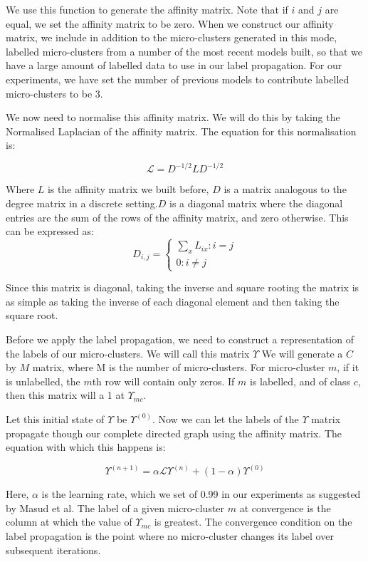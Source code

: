 \documentclass[12pt,a4paper,oneside]{report}
\begin{document}
We use this function to generate the affinity matrix. Note that if $i$ and $j$ are equal, we set the affinity matrix to be zero. When we construct our affinity matrix, we include in addition to the micro-clusters generated in this mode, labelled micro-clusters from a number of the most recent models built, so that we have a large amount of labelled data to use in our label propagation. For our experiments, we have set the number of previous models to contribute labelled micro-clusters to be 3.

We now need to normalise this affinity matrix. We will do this by taking the Normalised Laplacian of the affinity matrix. The equation for this normalisation is:

\[ \mathscr{L} = D^{-1/2}LD^{-1/2}\] 

Where $L$ is the affinity matrix we built before,  $D$ is a matrix analogous to the degree matrix in a discrete setting.$D$ is a diagonal matrix where the diagonal entries are the sum of the rows of the affinity matrix, and zero otherwise. This can be expressed as:
\[
	D_{i,j} =
	\begin{cases} 
	 \sum_{x} L_{ix} : i = j \\
	0 :					 i  \neq j 
\end{cases}\] 

Since this matrix is diagonal, taking the inverse and square rooting the matrix is as simple as taking the inverse of each diagonal element and then taking the square root.

Before we apply the label propagation, we need to construct a representation of the labels of our micro-clusters. We will call this matrix $\Upsilon$ We will generate a $C$ by $M$ matrix, where M is the number of micro-clusters. For micro-cluster $m$, if it is unlabelled, the $m$th row will contain only zeros. If $m$ is labelled, and of class $c$, then this matrix will a 1 at $\Upsilon_{mc}$.

Let this initial state of $\Upsilon$ be $\Upsilon^{(0)}$. Now we can let the labels of the $\Upsilon$ matrix propagate though our complete directed graph using the affinity matrix. The equation with which this happens is:

\[ \Upsilon^{(n+1)} = \alpha \mathscr{L} \Upsilon^{(n)} + (1 - \alpha) \Upsilon^{(0)}\] 

Here, $\alpha $ is the learning rate, which we set of 0.99 in our experiments as suggested by Masud et al.\cite{TechRep} The label of a given micro-cluster $m$ at convergence is the column at which the value of $\Upsilon_{mc}$ is greatest. The convergence condition on the label propagation is the point where no micro-cluster changes its label over subsequent iterations. 
\end{document}
